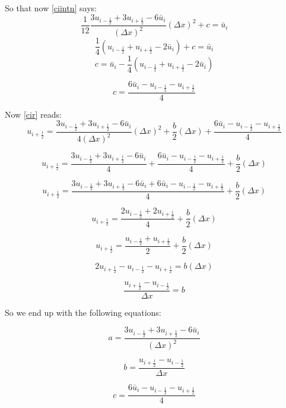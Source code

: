 \documentclass[12pt]{article}
\begin{document}
So that now \eqref{ciintn} says:
\[\frac{1}{12}\frac{3u_{i - \frac{1}{2}} +3u_{i + \frac{1}{2}} -6\bar{u}_i}{(\Delta x)^2}(\Delta x)^2 + c =\bar{u}_i \]
\[\frac{1}{4}\left(u_{i - \frac{1}{2}} +u_{i + \frac{1}{2}} -2\bar{u}_i\right) + c =\bar{u}_i \]
\[c =\bar{u}_i - \frac{1}{4}\left(u_{i - \frac{1}{2}} +u_{i + \frac{1}{2}} -2\bar{u}_i\right)  \]

\[c = \frac{6\bar{u}_i-u_{i - \frac{1}{2}} -u_{i + \frac{1}{2}}}{4}  \]

Now \ref{cir} reads:
\[u_{i + \frac{1}{2}} = \frac{3u_{i - \frac{1}{2}} +3u_{i + \frac{1}{2}} -6\bar{u}_i}{4(\Delta x)^2}(\Delta x)^2 +\frac{b}{2}(\Delta x) + \frac{6\bar{u}_i-u_{i - \frac{1}{2}} -u_{i + \frac{1}{2}}}{4}   \]

\[u_{i + \frac{1}{2}} = \frac{3u_{i - \frac{1}{2}} +3u_{i + \frac{1}{2}} -6\bar{u}_i}{4} + \frac{6\bar{u}_i-u_{i - \frac{1}{2}} -u_{i + \frac{1}{2}}}{4} +\frac{b}{2}(\Delta x)   \]

\[u_{i + \frac{1}{2}} = \frac{3u_{i - \frac{1}{2}} +3u_{i + \frac{1}{2}} -6\bar{u}_i + 6\bar{u}_i-u_{i - \frac{1}{2}} -u_{i + \frac{1}{2}}}{4} +\frac{b}{2}(\Delta x)   \]

\[u_{i + \frac{1}{2}} = \frac{2u_{i - \frac{1}{2}} +2u_{i + \frac{1}{2}} }{4} +\frac{b}{2}(\Delta x)   \]

\[u_{i + \frac{1}{2}} = \frac{u_{i - \frac{1}{2}} +u_{i + \frac{1}{2}} }{2} +\frac{b}{2}(\Delta x)   \]

\[2u_{i + \frac{1}{2}} - u_{i - \frac{1}{2}} - u_{i + \frac{1}{2}} = b(\Delta x)   \]

\[\frac{u_{i + \frac{1}{2}} - u_{i - \frac{1}{2}} }{\Delta x} = b   \]

So we end up with the following equations:

\[a = \frac{3u_{i - \frac{1}{2}} +3u_{i + \frac{1}{2}} -6\bar{u}_i}{(\Delta x)^2} \]

\[b = \frac{u_{i + \frac{1}{2}} - u_{i - \frac{1}{2}} }{\Delta x}  \]

\[c = \frac{6\bar{u}_i-u_{i - \frac{1}{2}} -u_{i + \frac{1}{2}}}{4}  \]
\end{document}
